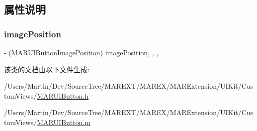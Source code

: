 \subsection{属性说明}
\mbox{\label{interface_m_a_r_u_i_button_a82dd59fe75c7068ccc9260f877d07e9c}} 
\subsubsection{\texorpdfstring{image\+Position}{imagePosition}}
{\footnotesize\ttfamily -\/ (M\+A\+R\+U\+I\+Button\+Image\+Position) image\+Position\hspace{0.3cm}{\ttfamily [read]}, {\ttfamily [write]}, {\ttfamily [nonatomic]}, {\ttfamily [assign]}}



该类的文档由以下文件生成\+:\begin{DoxyCompactItemize}
\item 
/\+Users/\+Martin/\+Dev/\+Source\+Tree/\+M\+A\+R\+E\+X\+T/\+M\+A\+R\+E\+X/\+M\+A\+R\+Extension/\+U\+I\+Kit/\+Custom\+Views/\hyperlink{_m_a_r_u_i_button_8h}{M\+A\+R\+U\+I\+Button.\+h}\item 
/\+Users/\+Martin/\+Dev/\+Source\+Tree/\+M\+A\+R\+E\+X\+T/\+M\+A\+R\+E\+X/\+M\+A\+R\+Extension/\+U\+I\+Kit/\+Custom\+Views/\hyperlink{_m_a_r_u_i_button_8m}{M\+A\+R\+U\+I\+Button.\+m}\end{DoxyCompactItemize}

